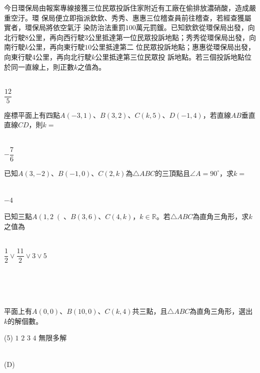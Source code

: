 \documentclass
[answers]
{exam}
\newcommand\ul[1]{\uline{\hspace*{#1}}}
\theoremstyle{definition}
\begin{document}
\begin{questions}
\question

今日環保局由報案專線接獲三位民眾投訴住家附近有工廠在偷排放濃硝酸，造成嚴重空汙。環
保局便立即指派欽欽、秀秀、惠惠三位稽查員前往稽查，若經查獲屬實者，環保局將依空氣汙
染防治法重罰$100$萬元罰鍰。已知欽欽從環保局出發，向北行駛$8$公里，再向西行駛$3$公里抵達第一位民眾投訴地點；秀秀從環保局出發，向南行駛$k$公里，再向東行駛$10$公里抵達第二
位民眾投訴地點；惠惠從環保局出發，向東行駛$4$公里，再向北行駛$k$公里抵達第三位民眾投
訴地點。若三個投訴地點位於同一直線上，則正數$k$之值為\ul{50pt}。
\\ 
\begin{solution}~\\
	$\dfrac{12}{5}$
\end{solution}


\question

座標平面上有四點$A\left(-3,1\right)$、$B\left(3,2 \right)$、$C\left( k,5 \right)$、$D\left( -1,4\right)$，若直線$AB$垂直直線$CD$，則$k=$\ul{50pt}
\\ 
\begin{solution}~\\
	$-\dfrac{7}{6}$
\end{solution}

\question

已知$A\left(3,-2\right)$、$B\left(-1,0 \right)$、$C\left( 2,k \right)$為$\triangle ABC $的三頂點且$ \angle A = 90^{\circ}$，求$k=$\ul{50pt}
\\ 
\begin{solution}~\\
	$-4$
\end{solution}

\question

已知三點$A\left( 1,2\right($、$B\left( 3,6 \right)$、$C\left(4,k\right)$，$k\in \mathbb{R}$。若$\triangle ABC$為直角三角形，求$k$之值為\ul{50pt}
\\ 
\begin{solution}~\\
	$\dfrac{1}{2}  \vee \dfrac{11}{2} \vee 3 \vee 5$
\end{solution}
$ $\\$ $\\$ $\\
\question

平面上有$A\left(0,0\right)$、$B\left( 10,0\right)$、$C\left( k,4\right)$共三點，且$\triangle ABC$為直角三角形，選出$k$的解個數。
\begin{tasks}(5)
	\task $1$
	\task $2$
	\task $3$
	\task $4$
	\task 無限多解
\end{tasks}
\begin{solution}~\\
	(D)
\end{solution}



\end{questions}
\end{document}
